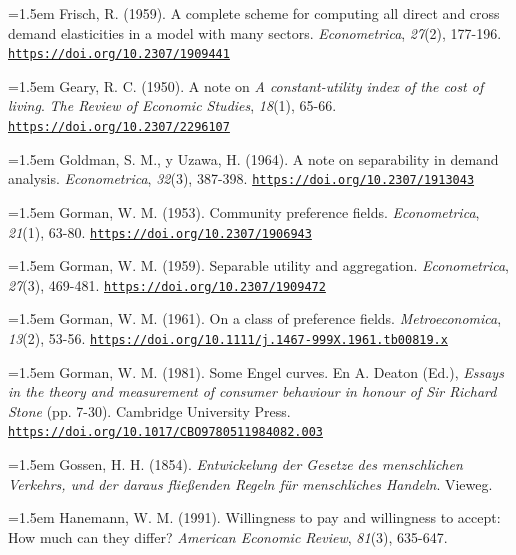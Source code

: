 \documentclass[10pt,a4paper]{article}
\begin{document}
\noindent\hangindent=1.5em Frisch, R. (1959). A complete scheme for computing all direct and cross demand elasticities in a model with many sectors. \textit{Econometrica}, \textit{27}(2), 177-196. \href{https://doi.org/10.2307/1909441}{\nolinkurl{https://doi.org/10.2307/1909441}}

\noindent\hangindent=1.5em Geary, R. C. (1950). A note on \textit{A constant-utility index of the cost of living}. \textit{The Review of Economic Studies}, \textit{18}(1), 65-66. \href{https://doi.org/10.2307/2296107}{\nolinkurl{https://doi.org/10.2307/2296107}}

\noindent\hangindent=1.5em Goldman, S. M., y Uzawa, H. (1964). A note on separability in demand analysis. \textit{Econometrica}, \textit{32}(3), 387-398. \href{https://doi.org/10.2307/1913043}{\nolinkurl{https://doi.org/10.2307/1913043}}

{\sloppy\noindent\hangindent=1.5em Gorman, W. M. (1953). Community preference fields. \textit{Econometrica}, \textit{21}(1), 63-80. \href{https://doi.org/10.2307/1906943}{\nolinkurl{https://doi.org/10.2307/1906943}}\par}

\noindent\hangindent=1.5em Gorman, W. M. (1959). Separable utility and aggregation. \textit{Econometrica}, \textit{27}(3), 469-481. \href{https://doi.org/10.2307/1909472}{\nolinkurl{https://doi.org/10.2307/1909472}}

\noindent\hangindent=1.5em Gorman, W. M. (1961). On a class of preference fields. \textit{Metroeconomica}, \textit{13}(2), 53-56. \href{https://doi.org/10.1111/j.1467-999X.1961.tb00819.x}{\nolinkurl{https://doi.org/10.1111/j.1467-999X.1961.tb00819.x}}

{\sloppy\noindent\hangindent=1.5em Gorman, W. M. (1981). Some Engel curves. En A. Deaton (Ed.), \textit{Essays in the theory and measurement of consumer behaviour in honour of Sir Richard Stone} (pp. 7-30). Cambridge University Press. \href{https://doi.org/10.1017/CBO9780511984082.003}{\nolinkurl{https://doi.org/10.1017/CBO9780511984082.003}}\par}

\noindent\hangindent=1.5em Gossen, H. H. (1854). \textit{Entwickelung der Gesetze des menschlichen Verkehrs, und der daraus fließenden Regeln für menschliches Handeln}. Vieweg.

\noindent\hangindent=1.5em Hanemann, W. M. (1991). Willingness to pay and willingness to accept: How much can they differ? \textit{American Economic Review}, \textit{81}(3), 635-647.
\end{document}
